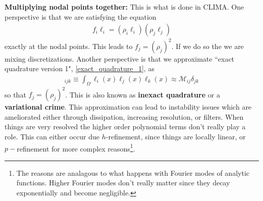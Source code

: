 \documentclass{report}
\numberwithin{equation}{section}
\begin{document}
\textbf{Multiplying nodal points together:} This is what is done in CLIMA. One perspective is that we are satisfying the equation
\begin{align}
    f_i \ell_i = (\rho_i \ell_i) (\rho_j \ell_j)
\end{align}
exactly at the nodal points. This leads to $f_j = (\rho_j)^2$. If we do so the we are mixing discretizations.
Another perspective is that we approximate ``exact quadrature version 1", \ref{exact_quadrature_1}, as
\begin{align}
   [\mathcal{Q}_1]_{ijk} \equiv \int_\Omega \ell_i(x) \ell_j(x) \ell_k(x) \approx \mathcal{M}_{ij} \delta_{jk}
\end{align}
so that $f_j = (\rho_j)^2$. This is also known as \textbf{inexact quadrature} or a \textbf{variational crime}. This approximation can lead to instability issues which are ameliorated either through dissipation, increasing resolution, or filters. When things are very resolved the higher order polynomial terms don't really play a role. This can either occur due $h$-refinement, since things are locally linear, or $p-$refinement for more complex reasons\footnote{The reasons are analagous to what happens with Fourier modes of analytic functions. Higher Fourier modes don't really matter since they decay exponentially and become negligible.}.
\end{document}
